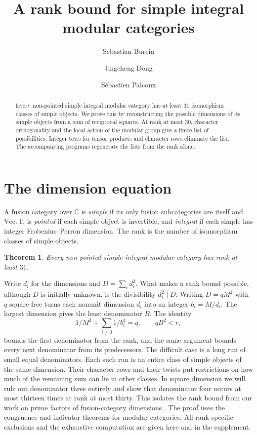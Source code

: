 \documentclass[11pt]{amsart}
\title[A rank bound for simple integral modular categories]{A rank bound for simple integral modular categories}
\author{Sebastian Burciu}
\author{Jingcheng Dong}
\author{S\'ebastien Palcoux}
\date{}
\numberwithin{equation}{section}
\newtheorem*{mainthm}{Theorem}
\begin{document}
\begin{abstract}
Every non-pointed simple integral modular category has at least $31$
isomorphism classes of simple objects. We prove this by reconstructing
the possible dimensions of its simple objects from a sum of reciprocal
squares. At rank at most $30$, character orthogonality and the local
action of the modular group give a finite list of possibilities.
Integer tests for tensor products and character rows eliminate the list.
The accompanying programs regenerate the lists from the rank alone.
\end{abstract}
\maketitle
\section{The dimension equation}
A fusion category over $\mathbb C$ is \emph{simple} if its only fusion
subcategories are itself and $\mathrm{Vec}$. It is \emph{pointed}
if each simple object is invertible, and \emph{integral} if each
simple has integer Frobenius--Perron dimension. The rank is the number
of isomorphism classes of simple objects.
\begin{mainthm}
Every non-pointed simple integral modular category has rank at least $31$.
\end{mainthm}

Write $d_i$ for the dimensions and $D=\sum_i d_i^2$.
What makes a rank bound possible, although $D$ is initially unknown,
is the divisibility $d_i^2\mid D$. Writing $D=qM^2$ with $q$ square-free
turns each nonunit dimension $d_i$ into an integer $b_i=M/d_i$.
The largest dimension gives the least denominator $B$. The identity
\[
            1/M^2+\sum_{i\ne0}1/b_i^2=q,\qquad qB^2<r,
\]
bounds the first denominator from the rank, and the same argument
bounds every next denominator from its predecessors. The difficult
case is a long run of small equal denominators. Each such run is an
entire class of simple objects of the same dimension. Their character
rows and their twists put restrictions on how much of the remaining
sum can lie in other classes. In square dimension we will rule out
denominator three entirely and show that denominator four occurs
at most thirteen times at rank at most thirty.
This isolates the rank bound from our work on prime factors of fusion-category
dimensions \cite{BDP}. The proof uses the congruence and indicator theorems for modular
categories. All rank-specific exclusions and the exhaustive computation
are given here and in the supplement.
\end{document}
